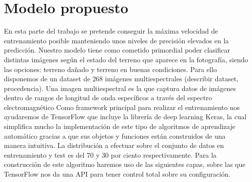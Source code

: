 \section{Modelo propuesto}\label{sec:modelo-propuesto}
En esta parte del trabajo se pretende conseguir la máxima velocidad de entrenamiento posible manteniendo unos niveles de precisión elevados en la predicción.
Nuestro modelo tiene como cometido primordial poder clasificar distintas imágenes según el estado del terreno que aparece en la fotografía, siendo las opciones: terreno dañado y
terreno en buenas condiciones.
Para ello disponemos de un dataset de 268 imágenes multiespectrales (describir dataset, procedencia).
Una imagen multiespectral es la que captura datos de imágenes dentro de rangos de longitud de onda específicos a través del espectro electromagnético
Como framework principal para realizar el entrenamiento nos ayudaremos de TensorFlow que incluye la librería de deep learning Keras, la cual simplifica mucho la implementación de este tipo de algoritmos de
aprendizaje automático gracias a que sus objetos y funciones están construidos de una manera intuitiva.
La distribución a efectuar sobre el conjunto de datos en entrenamiento y test es del 70 y 30 por ciento respectivamente.
Para la construcción de este algoritmo haremos uso de las siguientes capas, sobre las que TensorFlow nos da una API para tener control total sobre su configuración.

